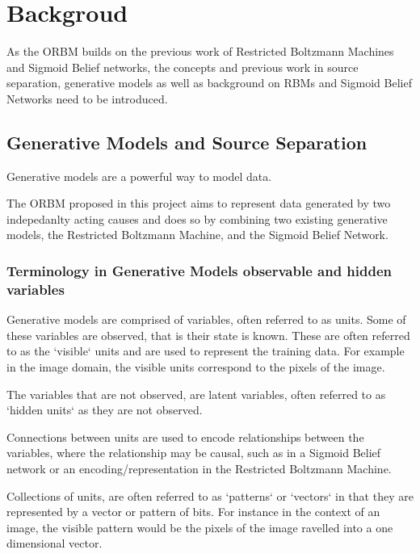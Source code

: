 \chapter{Backgroud}

 As the ORBM builds on the previous work of Restricted Boltzmann Machines and Sigmoid Belief networks, the concepts and previous work in source separation, generative models as well as background on RBMs and Sigmoid Belief Networks need to be introduced.


\section{Generative Models and Source Separation}

Generative models are a powerful way to model data.

The ORBM proposed in this project aims to represent data generated by two indepedanlty acting causes and does so by combining two existing generative models, the Restricted Boltzmann Machine, and the Sigmoid Belief Network.

\subsection{Terminology in Generative Models observable and hidden variables}

Generative models are comprised of variables, often referred to as units. Some of these variables are observed, that is their state is known. These are often referred to as the `visible` units and are used to represent the training data. For example in the image domain, the visible units correspond to the pixels of the image.

The variables that are not observed, are latent variables, often referred to as `hidden units` as they are not observed.

Connections between units are used to encode relationships between the variables, where the relationship may be causal, such as in a Sigmoid Belief network or an encoding/representation in the Restricted Boltzmann Machine.

Collections of units, are often referred to as `patterns` or `vectors` in that they are represented by a vector or pattern of bits. For instance in the context of an image, the visible pattern would be the pixels of the image ravelled into a one dimensional vector.


